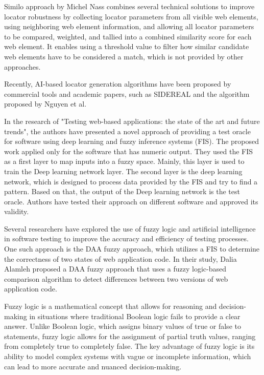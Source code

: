 \documentclass{article}
\begin{document}
Similo approach by Michel Nass combines several technical solutions to improve locator robustness by collecting locator parameters from all visible web elements, using neighboring web element information, and allowing all locator parameters to be compared, weighted, and tallied into a combined similarity score for each web element. It enables using a threshold value to filter how similar candidate web elements have to be considered a match, which is not provided by other approaches.

Recently, AI-based locator generation algorithms have been proposed by commercial tools and academic papers, such as SIDEREAL and the algorithm proposed by Nguyen et al.

In the research of "Testing web-based applications: the state of the art and future trends", the authors have presented a novel approach of providing a test oracle for software using deep learning and fuzzy inference systems (FIS). The proposed work applied only for the software that has numeric output. They used the FIS as a first layer to map inputs into a fuzzy space. Mainly, this layer is used to train the Deep learning network layer. The second layer is the deep learning network, which is designed to process data provided by the FIS and try to find a pattern. Based on that, the output of the Deep learning network is the test oracle. Authors have tested their approach on different software and approved its validity.

Several researchers have explored the use of fuzzy logic and artificial intelligence in software testing to improve the accuracy and efficiency of testing processes. One such approach is the DAA fuzzy approach, which utilizes a FIS to determine the correctness of two states of web application code. In their study, Dalia Alamleh proposed a DAA fuzzy approach that uses a fuzzy logic-based comparison algorithm to detect differences between two versions of web application code. 

Fuzzy logic is a mathematical concept that allows for reasoning and decision-making in situations where traditional Boolean logic fails to provide a clear answer. Unlike Boolean logic, which assigns binary values of true or false to statements, fuzzy logic allows for the assignment of partial truth values, ranging from completely true to completely false. The key advantage of fuzzy logic is its ability to model complex systems with vague or incomplete information, which can lead to more accurate and nuanced decision-making.
\end{document}
